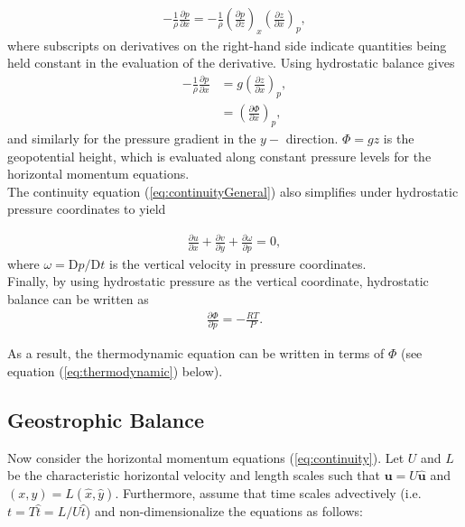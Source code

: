 \begin{align}
-\frac{1}{\rho} \frac{\partial p}{\partial x} = -\frac{1}{\rho} \left(\frac{\partial p}{\partial z}\right)_x \left(\frac{\partial z}{\partial x}\right)_p,
\end{align}
where subscripts on derivatives on the right-hand side indicate quantities being held constant in the evaluation of the derivative. Using hydrostatic balance gives
\begin{align}
-\frac{1}{\rho} \frac{\partial p}{\partial x} &=  g \left(\frac{\partial z}{\partial x}\right)_p,\\
&= \left( \frac{\partial \Phi}{\partial x}\right)_p,
\end{align}
and similarly for the pressure gradient in the $y-$ direction. $\Phi = gz$ is the geopotential height, which is evaluated along constant pressure levels for the horizontal momentum equations.\\

The continuity equation (\ref{eq:continuityGeneral}) also simplifies under hydrostatic pressure coordinates to yield

\begin{align}
\frac{\partial u}{\partial x} + \frac{\partial v}{\partial y} + \frac{\partial \omega}{\partial p} = 0,\label{eq:continuity}
\end{align}
where $\omega = \text{D}p/\text{D}t$ is the vertical velocity in pressure coordinates.\\

Finally, by using hydrostatic pressure as the vertical coordinate, hydrostatic balance can be written as
\begin{align}
\frac{\partial \Phi}{\partial p} = -\frac{RT}{P}. \label{eq:hydrostatic}
\end{align}

As a result, the thermodynamic equation can be written in terms of $\Phi$ (see equation (\ref{eq:thermodynamic}) below).

\subsection{Geostrophic Balance} 
\label{sec:geostrophic}
Now consider the horizontal momentum equations (\ref{eq:continuity}). Let $U$ and $L$ be the characteristic horizontal velocity and length scales such that $\mathbf{u} = U \mathbf{\hat{u}}$ and $(x,y) = L(\hat{x},\hat{y})$. Furthermore, assume that time scales advectively (i.e.\ $t = T \hat{t} = L/U \hat{t}$) and non-dimensionalize the equations as follows:

